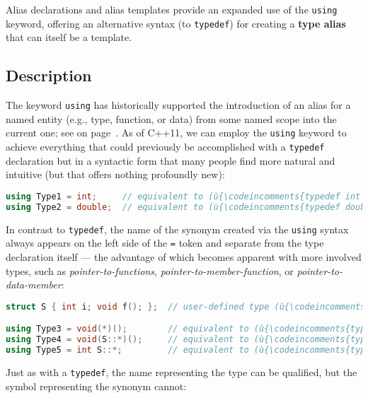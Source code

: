 

Alias declarations and alias templates provide an expanded use of the
\texttt{using} keyword, offering an alternative syntax (to
\texttt{typedef}) for creating a \textbf{type alias} that can itself be
a template.

\subsection[Description]{Description}\label{description}

The keyword \texttt{using} has historically supported the introduction
of an alias for a named entity (e.g., type, function, or data) from some
named scope into the current one; see {\it{}} on page~\pageref{appendix:-brief-review-of-(c++03)-using-declarations}. As of C++11, we can
employ the \texttt{using} keyword to achieve everything that could
previously be accomplished with a \texttt{typedef} declaration but in a
syntactic form that many people find more natural and intuitive (but
that offers nothing profoundly new):

\begin{lstlisting}[language=C++]
using Type1 = int;     // equivalent to (ù{\codeincomments{typedef int Type1;}}ù)
using Type2 = double;  // equivalent to (ù{\codeincomments{typedef double Type2;}}ù)
\end{lstlisting}
    
\noindent In contrast to \texttt{typedef}, the name of the synonym created via the
\texttt{using} syntax always appears on the left side of the \texttt{=}
token and separate from the type declaration itself --- the advantage of
which becomes apparent with more involved types, such as 
\emph{pointer-to-functions}, \emph{pointer-to-member-function}, or
\emph{pointer-to-data-member}:

\begin{lstlisting}[language=C++]
struct S { int i; void f(); };  // user-defined type (ù{\codeincomments{S}}ù) defined at file scope

using Type3 = void(*)();        // equivalent to (ù{\codeincomments{typedef void(*Type3)();}}ù)
using Type4 = void(S::*)();     // equivalent to (ù{\codeincomments{typedef void(S::*Type4)();}}ù)
using Type5 = int S::*;         // equivalent to (ù{\codeincomments{typedef int S::*Type5;}}ù)
\end{lstlisting}
    
\noindent Just as with a \texttt{typedef}, the name representing the type can be
qualified, but the symbol representing the synonym cannot:

